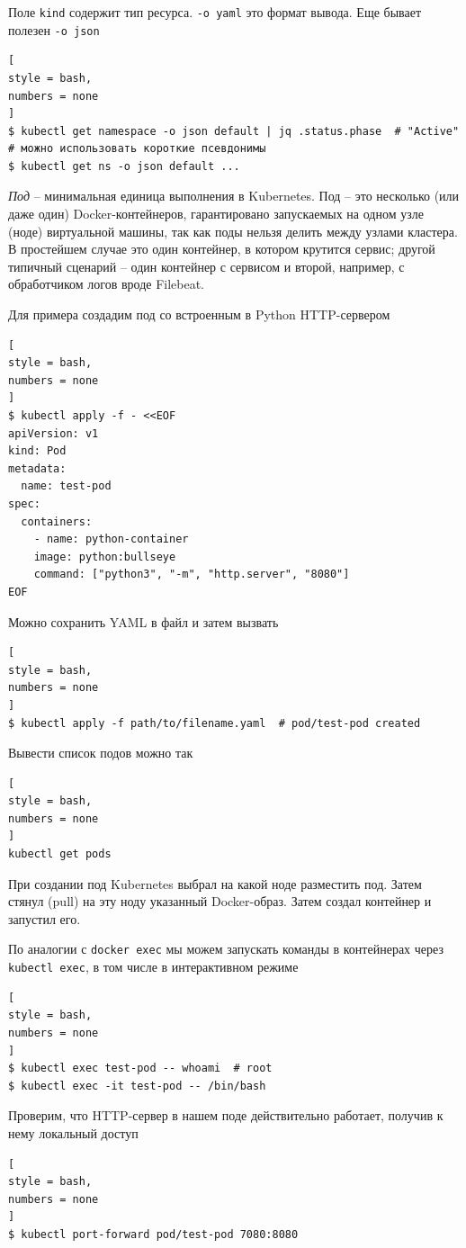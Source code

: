 \documentclass[%
	11pt,
	a4paper,
	utf8,
		]{article}
\begin{document}
Поле \verb*|kind| содержит тип ресурса. \verb|-o yaml| это формат вывода. Еще бывает полезен \verb|-o json|
\begin{lstlisting}[
style = bash,
numbers = none
]
$ kubectl get namespace -o json default | jq .status.phase  # "Active"
# можно использовать короткие псевдонимы
$ kubectl get ns -o json default ...
\end{lstlisting}

\emph{Под} -- минимальная единица выполнения в Kubernetes. Под -- это несколько (или даже один) Docker-контейнеров, гарантировано запускаемых на одном узле (ноде) виртуальной машины, так как поды нельзя делить между узлами кластера. В простейшем случае это один контейнер, в котором крутится сервис; другой типичный сценарий -- один контейнер с сервисом и второй, например, с обработчиком логов вроде Filebeat.

Для примера создадим под со встроенным в Python HTTP-сервером
\begin{lstlisting}[
style = bash,
numbers = none
]
$ kubectl apply -f - <<EOF
apiVersion: v1
kind: Pod
metadata:
  name: test-pod
spec:
  containers:
    - name: python-container
    image: python:bullseye
    command: ["python3", "-m", "http.server", "8080"]
EOF
\end{lstlisting}

Можно сохранить YAML в файл и затем вызвать
\begin{lstlisting}[
style = bash,
numbers = none
]
$ kubectl apply -f path/to/filename.yaml  # pod/test-pod created
\end{lstlisting}

Вывести список подов можно так
\begin{lstlisting}[
style = bash,
numbers = none
]
kubectl get pods
\end{lstlisting}

При создании под Kubernetes выбрал на какой ноде разместить под. Затем стянул (pull) на эту ноду указанный Docker-образ. Затем создал контейнер и запустил его.

По аналогии с \verb|docker exec| мы можем запускать команды в контейнерах через \verb*|kubectl exec|, в том числе в интерактивном режиме
\begin{lstlisting}[
style = bash,
numbers = none
]
$ kubectl exec test-pod -- whoami  # root
$ kubectl exec -it test-pod -- /bin/bash
\end{lstlisting}

Проверим, что HTTP-сервер в нашем поде действительно работает, получив к нему локальный доступ
\begin{lstlisting}[
style = bash,
numbers = none
]
$ kubectl port-forward pod/test-pod 7080:8080
\end{lstlisting}
\end{document}
